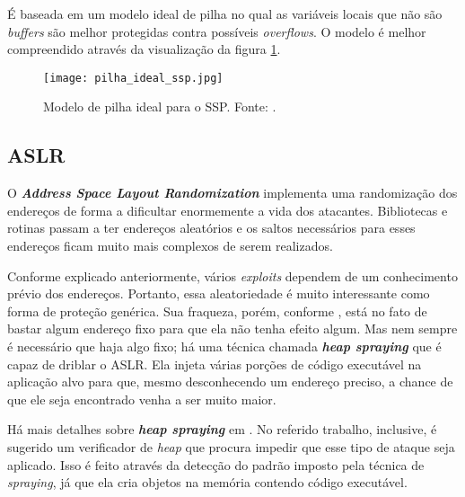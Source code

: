 			
			É baseada em um modelo ideal de pilha no qual as variáveis locais que não
			são \textsl{buffers} são melhor protegidas contra possíveis \textsl{overflows}.
			O modelo é melhor compreendido através da visualização da figura \ref{fig:pilha_ideal_ssp}.

			\begin{figure}
				\begin{center}
					\texttt{[image: pilha\_ideal\_ssp.jpg]}
					\caption{Modelo de pilha ideal para o SSP. Fonte: \cite{Martins2009}.}
					\label{fig:pilha_ideal_ssp}
				\end{center}
			\end{figure}


		\subsection{ASLR}
			O \textsl{\textbf{Address Space Layout Randomization}} implementa uma randomização
			dos endereços de forma a dificultar enormemente a vida dos atacantes.
			Bibliotecas e rotinas passam a ter endereços aleatórios e os saltos necessários
			para esses endereços ficam muito mais complexos de serem realizados.

			
			Conforme explicado anteriormente, vários \textsl{exploits} dependem de um conhecimento
			prévio dos endereços. Portanto, essa aleatoriedade é muito interessante como
			forma de proteção genérica. Sua fraqueza, porém, conforme \cite{Anley2007}, está no fato
			de bastar algum endereço fixo para que ela não tenha efeito algum. Mas nem sempre é necessário
			que haja algo fixo; há uma técnica chamada \textsl{\textbf{heap spraying}} que é capaz
			de driblar o ASLR. Ela injeta várias porções de código executável na aplicação alvo
			para que, mesmo desconhecendo um endereço preciso, a chance de que ele seja encontrado
			venha a ser muito maior.

			
			Há mais detalhes sobre \textsl{\textbf{heap spraying}} em \cite{Nozzle}. No referido trabalho,
			inclusive, é sugerido um verificador de \textsl{heap} que procura impedir que esse tipo
			de ataque seja aplicado. Isso é feito através da detecção do padrão imposto pela técnica
			de \textsl{spraying}, já que ela cria objetos na memória contendo código executável.
			
			
